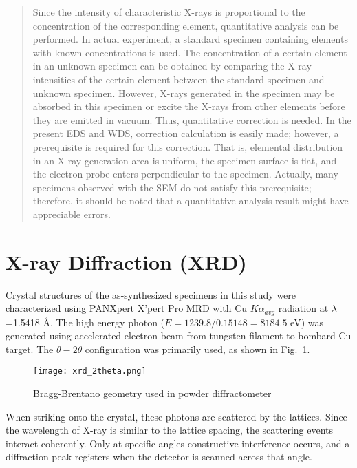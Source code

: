 \begin{quotation}
Since the intensity of characteristic X-rays is proportional to the concentration of the corresponding element, quantitative analysis
can be performed. In actual experiment, a standard specimen containing elements with known concentrations is used. The
concentration of a certain element in an unknown specimen can be obtained by comparing the X-ray intensities of the certain element
between the standard specimen and unknown specimen. However, X-rays generated in the specimen may be absorbed in
this specimen or excite the X-rays from other elements before they are emitted in vacuum. Thus, quantitative correction is needed.
In the present EDS and WDS, correction calculation is easily made; however, a prerequisite is required for this correction. That is,
elemental distribution in an X-ray generation area is uniform, the specimen surface is flat, and the electron probe enters perpendicular to the specimen. Actually, many specimens observed with the SEM do not satisfy this prerequisite; therefore, it should be noted that a quantitative analysis result might have appreciable errors.
\end{quotation}


\fi

\section{X-ray Diffraction (XRD)}

Crystal structures of the as-synthesized specimens in this study were characterized using PANXpert X’pert Pro MRD with Cu $K\alpha_{avg}$ radiation at $\lambda$=1.5418 \AA. The high energy photon ($E = 1239.8/0.15148= 8184.5$ eV) was generated using accelerated electron beam from tungsten filament to bombard Cu target. The $\theta-2\theta$ configuration was primarily used, as shown in Fig.~\ref{fig:ch2theta}. 
\begin{figure}[htb]
\centering
\texttt{[image: xrd\_2theta.png]}

\caption[XRD configuration]{Bragg-Brentano geometry used in powder diffractometer}
\label{fig:ch2theta}
\end{figure}
When striking onto the crystal, these photons are scattered by the lattices. Since the wavelength of X-ray is similar to the lattice spacing, the scattering events interact coherently. Only at specific angles constructive interference occurs, and a diffraction peak registers when the detector is scanned across that angle.  

